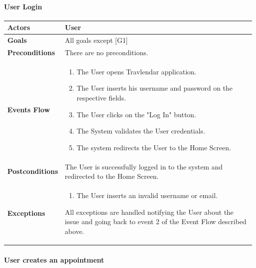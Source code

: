 \documentclass[12pt]{article}
\begin{document}
\newpage

\paragraph{User Login}
\begin{center}
    \begin{tabular} { |p{}|p{}| }
        \hline
        \textbf{Actors} & User \\ 
        \hline
        \textbf{Goals} & All goals except {[G1]} \\ 
        \hline  
        \textbf{Preconditions} & There are no preconditions. \\ 
        \hline
        \textbf{Events Flow} & \begin{enumerate}[topsep=0pt] 
                            \setlength{\itemsep}{0.5pt}
                            \item The User opens Travlendar application.
                            \item The User inserts his username and password on the respective fields.
                            \item The User clicks on the "Log In" button.
                            \item The System validates the User credentials.
                            \item The system redirects the User to the Home Screen.
                            \end{enumerate} \\
        \hline
        \textbf{Postconditions} & The User is successfully logged in to the system and redirected to the Home Screen. \\
        \hline
        \textbf{Exceptions} & \begin{enumerate}[topsep=0pt] 
                            \setlength{\itemsep}{0.5pt}
                            \item The User inserts an invalid username or email.
                            \end{enumerate} 
                            All exceptions are handled notifying the User about the issue and going back to event 2 of the Event Flow described above.\\ 
        \hline
    \end{tabular}
\end{center}

\newpage

\paragraph{User creates an appointment}
\end{document}
